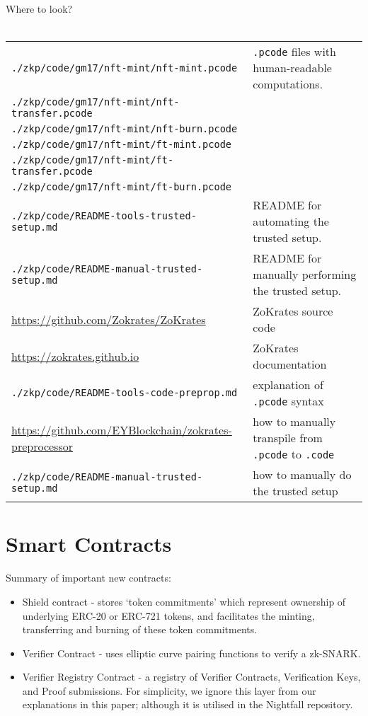 \documentclass{article}
\begin{document}
\begin{center}
  \begin{mdframed}[backgroundcolor=verylightblue]
    Where to look?\\
    \\
    \begin{tabular}{lp{14cm}}
      \texttt{./zkp/code/gm17/nft-mint/nft-mint.pcode} & \texttt{.pcode} files with human-readable computations.\\
      \texttt{./zkp/code/gm17/nft-mint/nft-transfer.pcode} & \\
      \texttt{./zkp/code/gm17/nft-mint/nft-burn.pcode} & \\
      \texttt{./zkp/code/gm17/nft-mint/ft-mint.pcode} & \\
      \texttt{./zkp/code/gm17/nft-mint/ft-transfer.pcode} & \\
      \texttt{./zkp/code/gm17/nft-mint/ft-burn.pcode} & \\
      \texttt{./zkp/code/README-tools-trusted-setup.md} & README for automating the trusted setup.\\
      \texttt{./zkp/code/README-manual-trusted-setup.md} & README for manually performing the trusted setup.\\
      \url{https://github.com/Zokrates/ZoKrates} & ZoKrates source code\\
      \url{https://zokrates.github.io} & ZoKrates documentation\\
      \texttt{./zkp/code/README-tools-code-preprop.md} & explanation of \texttt{.pcode} syntax\\
      \url{https://github.com/EYBlockchain/zokrates-preprocessor} & how to manually transpile from \texttt{.pcode} to \texttt{.code}\\
      \texttt{./zkp/code/README-manual-trusted-setup.md} & how to manually do the trusted setup
    \end{tabular}
  \end{mdframed}
\end{center}

\newpage
\section{Smart Contracts}
\label{sec:smartContracts}
\secttoc

Summary of important new contracts:
\begin{itemize}
  \item Shield contract - stores `token commitments' which represent ownership of underlying ERC-20 or ERC-721 tokens, and facilitates the minting, transferring and burning of these token commitments.
  \item Verifier Contract - uses elliptic curve pairing functions to verify a zk-SNARK.
  \item Verifier Registry Contract - a registry of Verifier Contracts, Verification Keys, and Proof submissions. For simplicity, we ignore this layer from our explanations in this paper; although it is utilised in the Nightfall repository.
\end{itemize}
\end{document}
